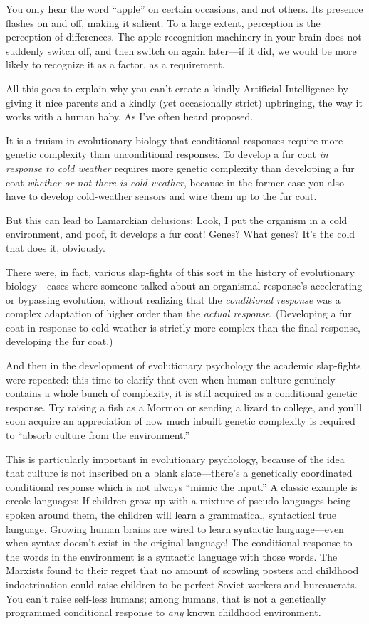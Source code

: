 {
 You only hear the word
``apple'' on certain occasions, and
not others. Its presence flashes on and off, making it salient. To a
large extent, perception is the perception of differences. The
apple-recognition machinery in your brain does not suddenly switch off,
and then switch on again later---if it did, we would be more likely to
recognize it as a factor, as a requirement.}

{
 All this goes to explain why you can't create a
kindly Artificial Intelligence by giving it nice parents and a kindly
(yet occasionally strict) upbringing, the way it works with a human
baby. As I've often heard proposed.}

{
 It is a truism in evolutionary biology that conditional responses
require more genetic complexity than unconditional responses. To
develop a fur coat \textit{in response to cold weather} requires more
genetic complexity than developing a fur coat \textit{whether or not
there is cold weather}, because in the former case you also have to
develop cold-weather sensors and wire them up to the fur coat.}

{
 But this can lead to Lamarckian delusions: Look, I put the
organism in a cold environment, and poof, it develops a fur coat!
Genes? What genes? It's the cold that does it,
obviously.}

{
 There were, in fact, various slap-fights of this sort in the
history of evolutionary biology---cases where someone talked about an
organismal response's accelerating or bypassing
evolution, without realizing that the \textit{conditional response} was
a complex adaptation of higher order than the \textit{actual response}.
(Developing a fur coat in response to cold weather is strictly more
complex than the final response, developing the fur coat.)}

{
 And then in the development of evolutionary psychology the
academic slap-fights were repeated: this time to clarify that even when
human culture genuinely contains a whole bunch of complexity, it is
still acquired as a conditional genetic response. Try raising a fish as
a Mormon or sending a lizard to college, and you'll
soon acquire an appreciation of how much inbuilt genetic complexity is
required to ``absorb culture from the
environment.''}

{
 This is particularly important in evolutionary psychology, because
of the idea that culture is not inscribed on a blank
slate---there's a genetically coordinated conditional
response which is not always ``mimic the
input.'' A classic example is creole languages: If
children grow up with a mixture of pseudo-languages being spoken around
them, the children will learn a grammatical, syntactical true language.
Growing human brains are wired to learn syntactic language---even when
syntax doesn't exist in the original language! The
conditional response to the words in the environment is a syntactic
language with those words. The Marxists found to their regret that no
amount of scowling posters and childhood indoctrination could raise
children to be perfect Soviet workers and bureaucrats. You
can't raise self-less humans; among humans, that is not
a genetically programmed conditional response to \textit{any} known
childhood environment.}

